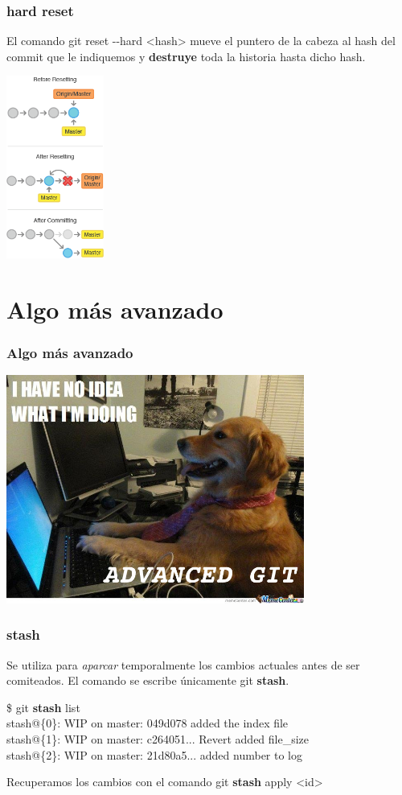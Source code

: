 \frame
{
\frametitle{hard reset}
 El comando git reset -{}-hard <hash> mueve el puntero de la cabeza al hash del commit que le indiquemos y \textbf{destruye} toda la historia hasta dicho hash.\\
 \begin{center}
    \includegraphics[height=6cm]{imgs/reset-hard.png}
 \end{center}
}

\section{Algo más avanzado}
\frame
{
\frametitle{Algo más avanzado}
\begin{center}
  \includegraphics[height=7.5cm]{imgs/noidea.jpg}
\end{center}
}

\frame
{
\frametitle{stash}
 Se utiliza para \textit{aparcar} temporalmente los cambios actuales antes de ser comiteados. El comando se escribe únicamente git \textbf{stash}.
 \begin{framed}
 \$ git \textbf{stash} list\\
 stash@\{0\}: WIP on master: 049d078 added the index file\\
 stash@\{1\}: WIP on master: c264051... Revert added file\_size\\
 stash@\{2\}: WIP on master: 21d80a5... added number to log
 \end{framed}
 
 Recuperamos los cambios con el comando git \textbf{stash} apply <id>
}

